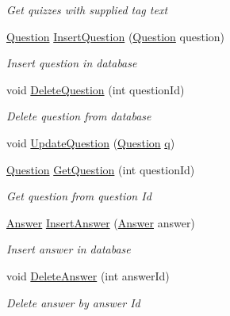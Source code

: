 \begin{DoxyCompactItemize}
\begin{DoxyCompactList}\small\item\em Get quizzes with supplied tag text \end{DoxyCompactList}\item 
\hyperlink{class_website_1_1_models_1_1_question}{Question} \hyperlink{class_website_1_1_models_1_1_d_a_l_e_f_a8b3d8411539c5565b7b3e7b4f72dcf59}{Insert\+Question} (\hyperlink{class_website_1_1_models_1_1_question}{Question} question)
\begin{DoxyCompactList}\small\item\em Insert question in database \end{DoxyCompactList}\item 
void \hyperlink{class_website_1_1_models_1_1_d_a_l_e_f_a4be322e153b76c661907db804af9473b}{Delete\+Question} (int question\+Id)
\begin{DoxyCompactList}\small\item\em Delete question from database \end{DoxyCompactList}\item 
void \hyperlink{class_website_1_1_models_1_1_d_a_l_e_f_a244c146013a5532a853e880cb227a8e9}{Update\+Question} (\hyperlink{class_website_1_1_models_1_1_question}{Question} \hyperlink{_scripts_2respond_8min_8js_aee3046c01d22ccd1efcb944608aec125}{q})
\item 
\hyperlink{class_website_1_1_models_1_1_question}{Question} \hyperlink{class_website_1_1_models_1_1_d_a_l_e_f_a99a1d0873a8ee83ead291fdd5004c035}{Get\+Question} (int question\+Id)
\begin{DoxyCompactList}\small\item\em Get question from question Id \end{DoxyCompactList}\item 
\hyperlink{class_website_1_1_models_1_1_answer}{Answer} \hyperlink{class_website_1_1_models_1_1_d_a_l_e_f_ae5997547eabfcfbebdf4e38d5357c9c5}{Insert\+Answer} (\hyperlink{class_website_1_1_models_1_1_answer}{Answer} answer)
\begin{DoxyCompactList}\small\item\em Insert answer in database \end{DoxyCompactList}\item 
void \hyperlink{class_website_1_1_models_1_1_d_a_l_e_f_ae8ff5dd7861a119158cc389d0343bebb}{Delete\+Answer} (int answer\+Id)
\begin{DoxyCompactList}\small\item\em Delete answer by answer Id \end{DoxyCompactList}\item 

\end{DoxyCompactItemize}
